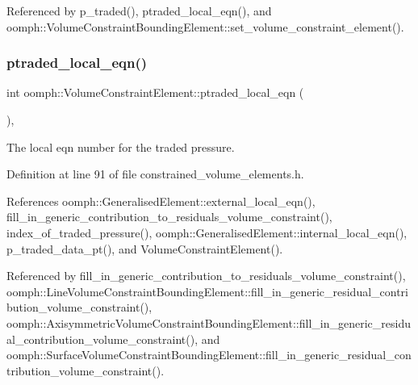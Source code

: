 Referenced by p\+\_\+traded(), ptraded\+\_\+local\+\_\+eqn(), and oomph\+::\+Volume\+Constraint\+Bounding\+Element\+::set\+\_\+volume\+\_\+constraint\+\_\+element().

\mbox{\label{classoomph_1_1VolumeConstraintElement_ad0dedf705ccfb713848ad960bf1b901d}} 
\subsubsection{\texorpdfstring{ptraded\+\_\+local\+\_\+eqn()}{ptraded\_local\_eqn()}}
{\footnotesize\ttfamily int oomph\+::\+Volume\+Constraint\+Element\+::ptraded\+\_\+local\+\_\+eqn (\begin{DoxyParamCaption}{ }\end{DoxyParamCaption})\hspace{0.3cm}{\ttfamily [inline]}, {\ttfamily [private]}}



The local eqn number for the traded pressure. 



Definition at line 91 of file constrained\+\_\+volume\+\_\+elements.\+h.



References oomph\+::\+Generalised\+Element\+::external\+\_\+local\+\_\+eqn(), fill\+\_\+in\+\_\+generic\+\_\+contribution\+\_\+to\+\_\+residuals\+\_\+volume\+\_\+constraint(), index\+\_\+of\+\_\+traded\+\_\+pressure(), oomph\+::\+Generalised\+Element\+::internal\+\_\+local\+\_\+eqn(), p\+\_\+traded\+\_\+data\+\_\+pt(), and Volume\+Constraint\+Element().



Referenced by fill\+\_\+in\+\_\+generic\+\_\+contribution\+\_\+to\+\_\+residuals\+\_\+volume\+\_\+constraint(), oomph\+::\+Line\+Volume\+Constraint\+Bounding\+Element\+::fill\+\_\+in\+\_\+generic\+\_\+residual\+\_\+contribution\+\_\+volume\+\_\+constraint(), oomph\+::\+Axisymmetric\+Volume\+Constraint\+Bounding\+Element\+::fill\+\_\+in\+\_\+generic\+\_\+residual\+\_\+contribution\+\_\+volume\+\_\+constraint(), and oomph\+::\+Surface\+Volume\+Constraint\+Bounding\+Element\+::fill\+\_\+in\+\_\+generic\+\_\+residual\+\_\+contribution\+\_\+volume\+\_\+constraint().



